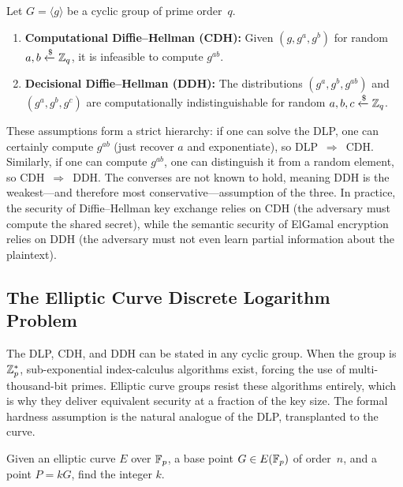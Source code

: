 \begin{definition}
\label{def:cdh-ddh}
Let $G = \langle g \rangle$ be a cyclic group of prime order~$q$.
\begin{enumerate}
\item \textbf{Computational Diffie--Hellman (CDH):}  Given $(g, g^a, g^b)$ for random $a, b \getsr \Z_q$, it is infeasible to compute $g^{ab}$.
\item \textbf{Decisional Diffie--Hellman (DDH):}  The distributions $(g^a, g^b, g^{ab})$ and $(g^a, g^b, g^c)$ are computationally indistinguishable for random $a, b, c \getsr \Z_q$.
\end{enumerate}
\end{definition}

These assumptions form a strict hierarchy: if one can solve the DLP, one can certainly compute $g^{ab}$ (just recover $a$ and exponentiate), so DLP~$\Rightarrow$~CDH.  Similarly, if one can compute $g^{ab}$, one can distinguish it from a random element, so CDH~$\Rightarrow$~DDH.  The converses are not known to hold, meaning DDH is the weakest---and therefore most conservative---assumption of the three.  In practice, the security of Diffie--Hellman key exchange relies on CDH (the adversary must compute the shared secret), while the semantic security of ElGamal encryption relies on DDH (the adversary must not even learn partial information about the plaintext).

\subsection{The Elliptic Curve Discrete Logarithm Problem}
\label{subsec:ecdlp-hardness}

The DLP, CDH, and DDH can be stated in any cyclic group.  When the group is $\mathbb{Z}_p^*$, sub-exponential index-calculus algorithms exist, forcing the use of multi-thousand-bit primes.  Elliptic curve groups resist these algorithms entirely, which is why they deliver equivalent security at a fraction of the key size.  The formal hardness assumption is the natural analogue of the DLP, transplanted to the curve.

\begin{definition}
\label{def:ecdlp}
Given an elliptic curve $E$ over $\mathbb{F}_p$, a base point $G \in E(\mathbb{F}_p)$ of order~$n$, and a point $P = kG$, find the integer $k$.
\end{definition}

